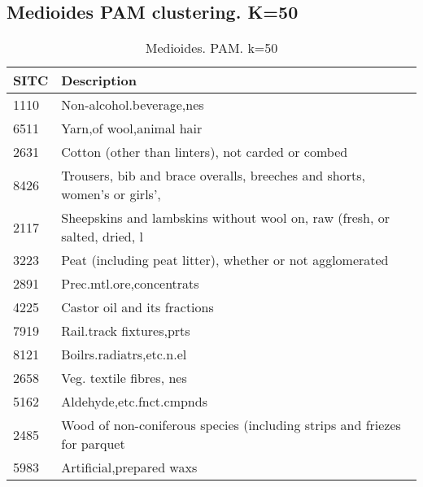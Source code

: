 \documentclass[class=article, crop=false]{standalone}
\begin{document}
\pagebreak

\subsection{Medioides PAM clustering. K=50}

\begin{longtable}{ll}
	\hline
	\textbf{SITC} & \textbf{Description}                                                      \\ \hline
	\endhead
	\hline
	\endfoot
	\caption{Medioides. PAM. k=50}
	\label{tabla:pam50}
	\endlastfoot
	1110          & Non-alcohol.beverage,nes                                                  \\
	6511          & Yarn,of wool,animal hair                                                  \\
	2631          & Cotton (other than linters), not carded or combed                         \\
	8426          & Trousers, bib and brace overalls, breeches and shorts, women's or girls', \\
	2117          & Sheepskins and lambskins without wool on, raw (fresh, or salted, dried, l \\
	3223          & Peat (including peat litter), whether or not agglomerated                 \\
	2891          & Prec.mtl.ore,concentrats                                                  \\
	4225          & Castor oil and its fractions                                              \\
	7919          & Rail.track fixtures,prts                                                  \\
	8121          & Boilrs.radiatrs,etc.n.el                                                  \\
	2658          & Veg. textile fibres, nes                                                  \\
	5162          & Aldehyde,etc.fnct.cmpnds                                                  \\
	2485          & Wood of non-coniferous species (including strips and friezes for parquet  \\
	5983          & Artificial,prepared waxs                                                  \\

\end{longtable}
\end{document}
